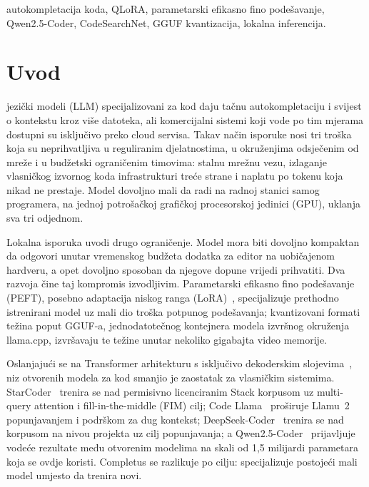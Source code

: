 \documentclass[10pt,conference,a4paper]{IEEEtran}
\begin{document}
\begin{IEEEkeywords}
autokompletacija koda, QLoRA, parametarski efikasno fino podešavanje,
Qwen2.5-Coder, CodeSearchNet, GGUF kvantizacija, lokalna inferencija.
\end{IEEEkeywords}

\section{Uvod}
 jezički modeli (LLM) specijalizovani za kod daju
tačnu autokompletaciju i svijest o kontekstu kroz više datoteka, ali
komercijalni sistemi koji vode po tim mjerama dostupni su isključivo preko
cloud servisa. Takav način isporuke nosi tri troška koja su neprihvatljiva u
reguliranim djelatnostima, u okruženjima odsječenim od mreže i u budžetski
ograničenim timovima: stalnu mrežnu vezu, izlaganje vlasničkog izvornog koda
infrastrukturi treće strane i naplatu po tokenu koja nikad ne prestaje. Model
dovoljno mali da radi na radnoj stanici samog programera, na jednoj
potrošačkoj grafičkoj procesorskoj jedinici (GPU), uklanja sva tri odjednom.

Lokalna isporuka uvodi drugo ograničenje. Model mora biti dovoljno kompaktan
da odgovori unutar vremenskog budžeta dodatka za editor na uobičajenom
hardveru, a opet dovoljno sposoban da njegove dopune vrijedi prihvatiti. Dva
razvoja čine taj kompromis izvodljivim. Parametarski efikasno fino
podešavanje (PEFT), posebno adaptacija niskog ranga
(LoRA)~\cite{hu2022lora}, specijalizuje prethodno istrenirani model uz mali
dio troška potpunog podešavanja; kvantizovani formati težina poput GGUF-a,
jednodatotečnog kontejnera modela izvršnog okruženja llama.cpp, izvršavaju te
težine unutar nekoliko gigabajta video memorije.

Oslanjajući se na Transformer arhitekturu s isključivo dekoderskim
slojevima~\cite{vaswani2017}, niz otvorenih modela za kod smanjio je zaostatak
za vlasničkim sistemima. StarCoder~\cite{li2023starcoder} trenira se nad
permisivno licenciranim Stack korpusom uz multi-query attention i
fill-in-the-middle (FIM) cilj; Code Llama~\cite{roziere2023} proširuje
Llamu~2 popunjavanjem i podrškom za dug kontekst;
DeepSeek-Coder~\cite{guo2024} trenira se nad korpusom na nivou projekta uz
cilj popunjavanja; a Qwen2.5-Coder~\cite{hui2024} prijavljuje vodeće rezultate
među otvorenim modelima na skali od 1,5 milijardi parametara koja se ovdje
koristi. Completus se razlikuje po cilju: specijalizuje postojeći mali
model umjesto da trenira novi.
\end{document}

